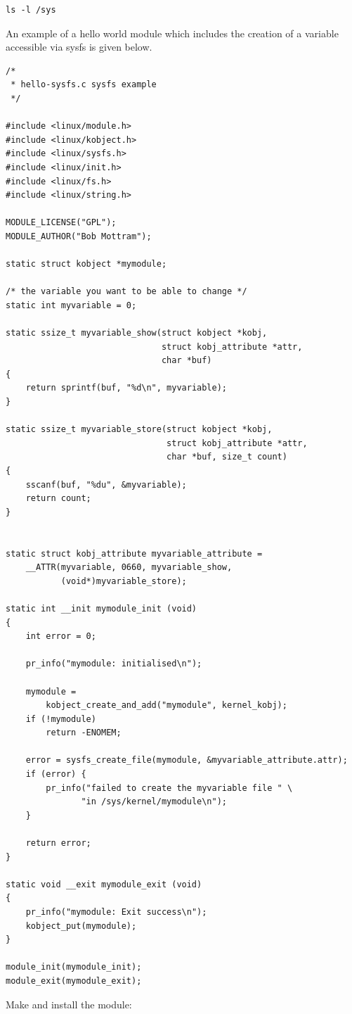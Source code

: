 \documentclass[11pt]{article}
\begin{document}
\begin{verbatim}
ls -l /sys
\end{verbatim}

An example of a hello world module which includes the creation of a variable accessible via sysfs is given below.

\begin{verbatim}
/*
 * hello-sysfs.c sysfs example
 */

#include <linux/module.h>
#include <linux/kobject.h>
#include <linux/sysfs.h>
#include <linux/init.h>
#include <linux/fs.h>
#include <linux/string.h>

MODULE_LICENSE("GPL");
MODULE_AUTHOR("Bob Mottram");

static struct kobject *mymodule;

/* the variable you want to be able to change */
static int myvariable = 0;

static ssize_t myvariable_show(struct kobject *kobj,
                               struct kobj_attribute *attr,
                               char *buf)
{
    return sprintf(buf, "%d\n", myvariable);
}

static ssize_t myvariable_store(struct kobject *kobj,
                                struct kobj_attribute *attr,
                                char *buf, size_t count)
{
    sscanf(buf, "%du", &myvariable);
    return count;
}


static struct kobj_attribute myvariable_attribute =
    __ATTR(myvariable, 0660, myvariable_show,
           (void*)myvariable_store);

static int __init mymodule_init (void)
{
    int error = 0;

    pr_info("mymodule: initialised\n");

    mymodule =
        kobject_create_and_add("mymodule", kernel_kobj);
    if (!mymodule)
        return -ENOMEM;

    error = sysfs_create_file(mymodule, &myvariable_attribute.attr);
    if (error) {
        pr_info("failed to create the myvariable file " \
               "in /sys/kernel/mymodule\n");
    }

    return error;
}

static void __exit mymodule_exit (void)
{
    pr_info("mymodule: Exit success\n");
    kobject_put(mymodule);
}

module_init(mymodule_init);
module_exit(mymodule_exit);
\end{verbatim}

Make and install the module:
\end{document}

